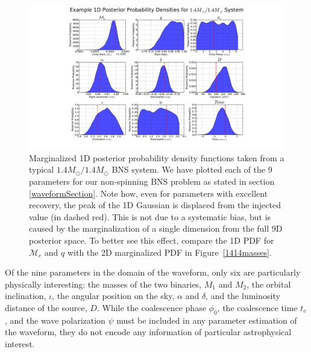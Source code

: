 \documentclass[11pt,a4paper]{emulateapj} 
\newcommand{\will}[1]{{\color{cyan} #1}}
\begin{document}
\begin{figure}[t!]
\centering \includegraphics[trim=7cm 0cm 0cm 0cm,
  clip=true,scale=0.55]{9dpdf}
\caption{\label{9dPDF} Marginalized 1D posterior probability density
  functions taken from a typical $1.4M_{\odot}/1.4M_{\odot}$ BNS
  system.  We have plotted each of the 9 parameters for our
  non-spinning BNS problem as stated in section \ref{waveformSection}.
  Note how, even for parameters with excellent recovery, the peak of
  the 1D Gaussian is displaced from the injected value (in dashed
  red).  This is not due to a systematic bias, but is caused by the
  marginalization of a single dimension from the full 9D posterior
  space.  To better see this effect, compare the 1D PDF for
  $\mathcal{M}_{c}$ and $q$ with the 2D marginalized PDF in
  Figure~\ref{1414masses}.}
\end{figure}

Of the nine parameters in the domain of the waveform, only six are
particularly physically interesting: the masses of the two binaries,
$M_1$ and $M_2$, the orbital inclination, $\iota$, the angular
position on the sky, $\alpha$ and $\delta$, and the luminosity
distance of the source, $D$.  While the coalescence phase $\phi_0$,
the coalescence time $t_c$, and the wave polarization $\psi$ must be
included in any parameter estimation of the waveform, they do not
encode any information of particular astrophysical
interest.%
\end{document}
